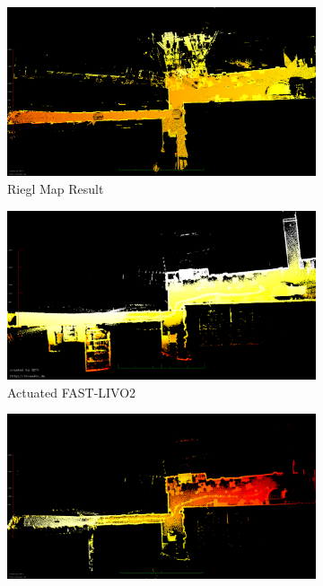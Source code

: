 \documentclass[a4paper, conference]{IEEEtran}
\begin{document}
\begin{figure}[t]
\centering
\begin{subfigure}{0.492\columnwidth}
        \centering
        \includegraphics[width=\textwidth]{pics/eagle_view/riegl_top.png}
        \caption{Riegl Map Result}
        \label{fig:riegl_top}\end{subfigure}
\hfill
\begin{subfigure}{0.492\columnwidth}
        \centering
        \includegraphics[width=\textwidth]{pics/eagle_view/act_livo_to.png}
        \caption{Actuated FAST-LIVO2}
        \label{fig:act_livo_top}
\end{subfigure}\vspace{2mm}
\begin{subfigure}{0.492\columnwidth}
        \centering
        \includegraphics[width=\textwidth]{pics/eagle_view/act_lio_top.png}

\end{subfigure}
\end{figure}
\end{document}
